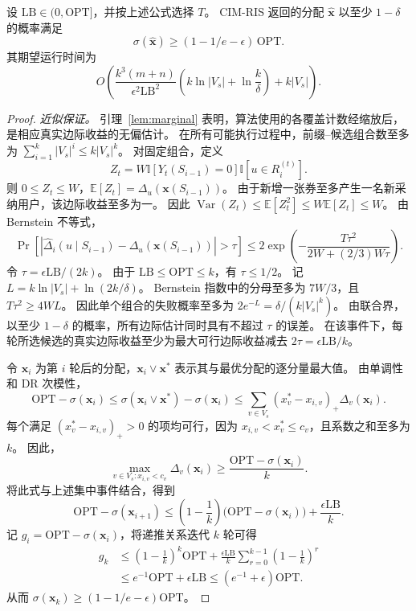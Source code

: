 \documentclass[sigconf,balance=false]{acmart}
\newcommand{\CIMRIS}{\textsc{CIM-RIS}}
\newcommand{\E}{\mathbb{E}}
\newcommand{\I}{\mathbb{I}}
\begin{document}
\begin{theorem}
\label{thm:approx}
设 $\mathrm{LB}\in(0,\mathrm{OPT}]$，并按上述公式选择 $T$。
\CIMRIS{} 返回的分配 $\hat{\bm{x}}$ 以至少 $1-\delta$ 的概率满足
\[
  \sigma(\hat{\bm{x}})
  \geq (1-1/e-\epsilon)\,\mathrm{OPT}.
\]
其期望运行时间为
\[
  O\!\left(
    \frac{k^3(m+n)}{\epsilon^2\mathrm{LB}^2}
    \left(k\ln |V_s|+\ln\frac{k}{\delta}\right)
    +k|V_s|
  \right).
\]
\end{theorem}

\begin{proof}
\textit{近似保证。}
引理~\ref{lem:marginal} 表明，算法使用的各覆盖计数经缩放后，是相应真实边际收益的无偏估计。
在所有可能执行过程中，前缀--候选组合数至多为 $\sum_{i=1}^k|V_s|^i\leq k|V_s|^k$。
对固定组合，定义
\[
  Z_t=W\I[Y_t(S_{i-1})=0]\I[u\in R_i^{(t)}].
\]
则 $0\leq Z_t\leq W$，$\E[Z_t]=\Delta_u(\bm{x}(S_{i-1}))$。
由于新增一张券至多产生一名新采纳用户，该边际收益至多为一。
因此 $\operatorname{Var}(Z_t)\leq\E[Z_t^2]\leq W\E[Z_t]\leq W$。
由 Bernstein 不等式，
\[
  \Pr\!\left[
    |\widehat{\Delta}_i(u\mid S_{i-1})
      -\Delta_u(\bm{x}(S_{i-1}))|>\tau
  \right]
  \leq
  2\exp\!\left(
    -\frac{T\tau^2}{2W+(2/3)W\tau}
  \right).
\]
令 $\tau=\epsilon\mathrm{LB}/(2k)$。
由于 $\mathrm{LB}\leq\mathrm{OPT}\leq k$，有 $\tau\leq1/2$。
记 $L=k\ln|V_s|+\ln(2k/\delta)$。
Bernstein 指数中的分母至多为 $7W/3$，且 $T\tau^2\geq4WL$。
因此单个组合的失败概率至多为 $2e^{-L}=\delta/(k|V_s|^k)$。
由联合界，以至少 $1-\delta$ 的概率，所有边际估计同时具有不超过 $\tau$ 的误差。
在该事件下，每轮所选候选的真实边际收益至少为最大可行边际收益减去 $2\tau=\epsilon\mathrm{LB}/k$。

令 $\bm{x}_i$ 为第 $i$ 轮后的分配，$\bm{x}_i\vee\bm{x}^*$ 表示其与最优分配的逐分量最大值。
由单调性和 DR 次模性，
\[
  \mathrm{OPT}-\sigma(\bm{x}_i)
  \leq \sigma(\bm{x}_i\vee\bm{x}^*)-\sigma(\bm{x}_i)
  \leq \sum_{v\in V_s}(x_v^*-x_{i,v})_+\Delta_v(\bm{x}_i).
\]
每个满足 $(x_v^*-x_{i,v})_+>0$ 的项均可行，因为 $x_{i,v}<x_v^*\leq c_v$，且系数之和至多为 $k$。
因此，
\[
  \max_{v\in V_s:x_{i,v}<c_v}\Delta_v(\bm{x}_i)
  \geq \frac{\mathrm{OPT}-\sigma(\bm{x}_i)}{k}.
\]
将此式与上述集中事件结合，得到
\[
  \mathrm{OPT}-\sigma(\bm{x}_{i+1})
  \leq
  \left(1-\frac{1}{k}\right)
  \bigl(\mathrm{OPT}-\sigma(\bm{x}_i)\bigr)
  +
  \frac{\epsilon\mathrm{LB}}{k}.
\]
记 $g_i=\mathrm{OPT}-\sigma(\bm{x}_i)$，将递推关系迭代 $k$ 轮可得
\begin{align*}
  g_k
  &\leq \left(1-\frac{1}{k}\right)^k\mathrm{OPT}
    +\frac{\epsilon\mathrm{LB}}{k}
      \sum_{r=0}^{k-1}\left(1-\frac{1}{k}\right)^r \\
  &\leq e^{-1}\mathrm{OPT}+\epsilon\mathrm{LB}
  \leq (e^{-1}+\epsilon)\mathrm{OPT}.
\end{align*}
从而 $\sigma(\bm{x}_k)\geq(1-1/e-\epsilon)\mathrm{OPT}$。


\end{proof}
\end{document}

